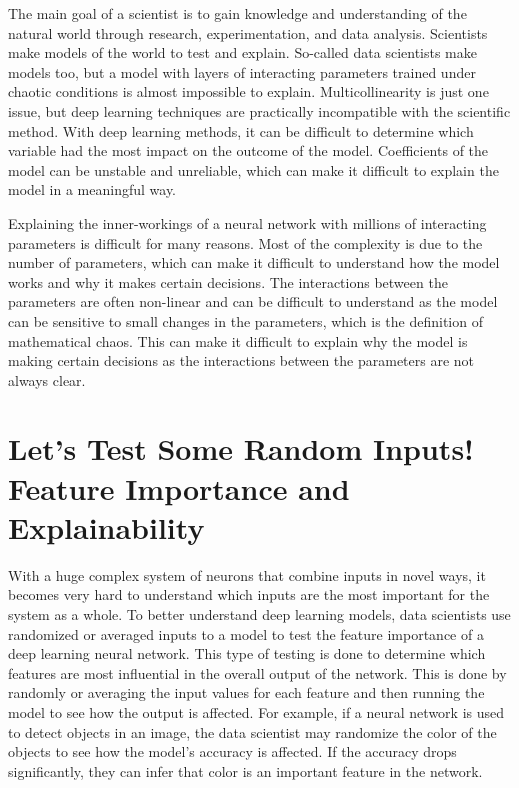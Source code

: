 The main goal of a scientist is to gain knowledge and understanding of the natural world through research, experimentation, and data analysis. Scientists make models of the world to test and explain. So-called data scientists make models too, but a model with layers of interacting parameters trained under chaotic conditions is almost impossible to explain. Multicollinearity is just one issue, but deep learning techniques are practically incompatible with the scientific method. With deep learning methods, it can be difficult to determine which variable had the most impact on the outcome of the model. Coefficients of the model can be unstable and unreliable, which can make it difficult to explain the model in a meaningful way.

Explaining the inner-workings of a neural network with millions of interacting parameters is difficult for many reasons. Most of the complexity is due to the number of parameters, which can make it difficult to understand how the model works and why it makes certain decisions. The interactions between the parameters are often non-linear and can be difficult to understand as the model can be sensitive to small changes in the parameters, which is the definition of mathematical chaos. This can make it difficult to explain why the model is making certain decisions as the interactions between the parameters are not always clear.

\section{Let's Test Some Random Inputs! Feature Importance and Explainability}

With a huge complex system of neurons that combine inputs in novel ways, it becomes very hard to understand which inputs are the most important for the system as a whole. To better understand deep learning models, data scientists use randomized or averaged inputs to a model to test the feature importance of a deep learning neural network. This type of testing is done to determine which features are most influential in the overall output of the network. This is done by randomly or averaging the input values for each feature and then running the model to see how the output is affected. For example, if a neural network is used to detect objects in an image, the data scientist may randomize the color of the objects to see how the model’s accuracy is affected. If the accuracy drops significantly, they can infer that color is an important feature in the network.

